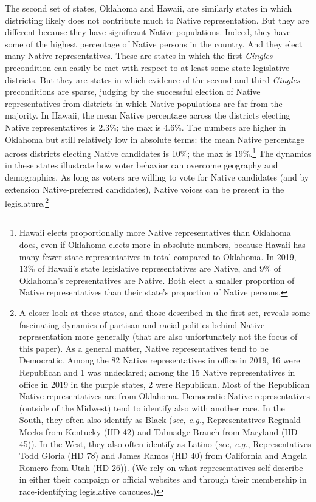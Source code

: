 \documentclass[12pt]{article}
\begin{document}
The second set of states, Oklahoma and Hawaii, are similarly states in which districting likely does not contribute much to Native representation. But they are different because they have significant Native populations. Indeed, they have some of the highest percentage of Native persons in the country. And they elect many Native representatives. These are states in which the first \textit{Gingles} precondition can easily be met with respect to at least some state legislative districts. But they are states in which evidence of the second and third \textit{Gingles} preconditions are sparse, judging by the successful election of Native representatives from districts in which Native populations are far from the majority. In Hawaii, the mean Native percentage across the districts electing Native representatives is 2.3\%; the max is 4.6\%. The numbers are higher in Oklahoma but still relatively low in absolute terms: the mean Native percentage across districts electing Native candidates is 10\%; the max is 19\%.\footnote{Hawaii elects proportionally more Native representatives than Oklahoma does, even if Oklahoma elects more in absolute numbers, because Hawaii has many fewer state representatives in total compared to Oklahoma. In 2019, 13\% of Hawaii's state legislative representatives are Native, and 9\% of Oklahoma's representatives are Native. Both elect a smaller proportion of Native representatives than their state's proportion of Native persons.} The dynamics in these states illustrate how voter behavior can overcome geography and demographics. As long as voters are willing to vote for Native candidates (and by extension Native-preferred candidates), Native voices can be present in the legislature.\footnote{A closer look at these states, and those described in the first set, reveals some fascinating dynamics of partisan and racial politics behind Native representation more generally (that are also unfortunately not the focus of this paper). As a general matter, Native representatives tend to be Democratic. Among the 82 Native representatives in office in 2019, 16 were Republican and 1 was undeclared; among the 15 Native representatives in office in 2019 in the purple states, 2 were Republican. Most of the Republican Native representatives are from Oklahoma. Democratic Native representatives (outside of the Midwest) tend to identify also with another race. In the South, they often also identify as Black (\textit{see, e.g.}, Representatives Reginald Meeks from Kentucky (HD 42) and Talmadge Branch from Maryland (HD 45)). In the West, they also often identify as Latino (\textit{see, e.g.}, Representatives Todd Gloria (HD 78) and James Ramos (HD 40) from California and Angela Romero from Utah (HD 26)). (We rely on what representatives self-describe in either their campaign or official websites and through their membership in race-identifying legislative caucuses.)}
\end{document}
